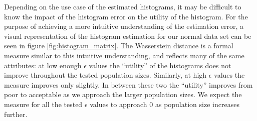 \documentclass[12pt]{article}
\begin{document}
\begin{description}
    Depending on the use case of the estimated histograms, it may be difficult to know the impact of the histogram error on the utility of the histogram. For the purpose of achieving a more intuitive understanding of the estimation error, a visual representation of the histogram estimation for our normal data set can be seen in figure \ref{fig:histogram_matrix}. The Wasserstein distance is a formal measure similar to this intuitive understanding, and reflects many of the same attributes: at low enough $\epsilon$ values the ``utility'' of the histograms does not improve throughout the tested population sizes. Similarly, at high $\epsilon$ values the measure improves only slightly. In between these two the ``utility'' improves from poor to acceptable as we approach the larger population sizes. We expect the measure for all the tested $\epsilon$ values to approach 0 as population size increases further.
    

\end{description}
\end{document}
